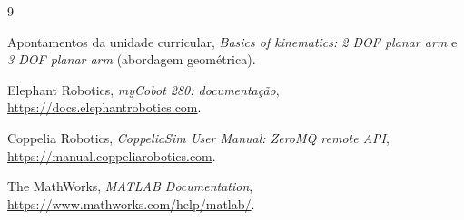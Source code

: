 \begin{thebibliography}{9}

Apontamentos da unidade curricular, \textit{Basics of kinematics: 2 DOF planar arm} e \textit{3 DOF planar arm} (abordagem geométrica).

Elephant Robotics, \textit{myCobot 280: documentação}, \url{https://docs.elephantrobotics.com}.

Coppelia Robotics, \textit{CoppeliaSim User Manual: ZeroMQ remote API}, \url{https://manual.coppeliarobotics.com}.

The MathWorks, \textit{MATLAB Documentation}, \url{https://www.mathworks.com/help/matlab/}.

\end{thebibliography}
